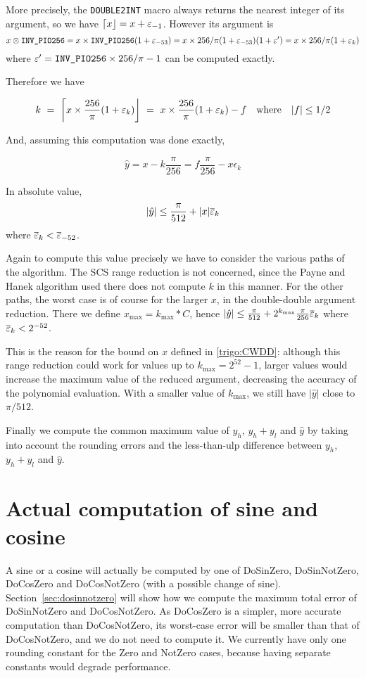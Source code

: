 More precisely, the \texttt{DOUBLE2INT} macro always returns the
nearest integer of its argument, so we have
$\left\lceil x \right\rfloor=x+\varepsilon_{-1}$. However its argument is
$$x\otimes\verb!INV_PIO256! = x \times
\verb!INV_PIO256!(1+\epsilon_{-53}) = x\times
256/\pi(1+\epsilon_{-53})(1+\epsilon')  = x\times
256/\pi(1+\epsilon_k)$$
where $\epsilon'=\verb!INV_PIO256!\times256/\pi-1$ can be
computed exactly.

Therefore we have 

$$k\ =\ \left\lceil x\times \frac{256}{\pi}(1+\varepsilon_k) \right\rfloor
\ =\ x\times \frac{256}{\pi}(1+\varepsilon_k) - f \quad\mbox{where} \quad |f|\le 1/2
$$

And, assuming this computation was done exactly,

$$\hat{y}=x-k\frac{\pi}{256} = f\frac{\pi}{256} - x\epsilon_k$$

In absolute value, $$\left|\hat{y}\right| \le \frac{\pi}{512} +
|x|{\overline{\varepsilon}}_k$$
where ${\overline{\varepsilon}}_k<{\overline{\varepsilon}}_{-52}$.

Again to compute this value precisely we have to consider the various
paths of the algorithm. The SCS range reduction is not concerned,
since the Payne and Hanek algorithm used there does not compute $k$ in
this manner. For the other paths, the worst case is of course for the
larger $x$, in the double-double argument reduction. There we define
$x_{\max} = k_{\max}*C$, hence  $\left|\hat{y}\right|
\le \frac{\pi}{512} + 2^{k_{\max}}\frac{\pi}{256}{\overline{\varepsilon}}_k$ where
${\overline{\varepsilon}}_k<2^{-52}$.


This is the reason for the bound on $x$ defined in \ref{trigo:CWDD}:
although this range reduction could work for values up to
$k_{\max}=2^{52}-1$, larger values would increase the maximum
value of the reduced argument, decreasing the accuracy of the
polynomial evaluation. With a smaller value of $k_{\max}$, we still have
$\left|\hat{y}\right|$ close to $\pi/512$. 

Finally we compute the common maximum value of $y_h$, $y_h+y_l$ and
$\widehat{y}$ by taking into account the rounding errors and the
less-than-ulp difference between $y_h$, $y_h+y_l$ and $\widehat{y}$.
 



\section{Actual computation of sine and cosine
  \label{trigo:auxiliary}}

A sine or a cosine will actually be computed by one of DoSinZero,
DoSinNotZero, DoCosZero and DoCosNotZero (with a possible change of sine).
Section~\ref{sec:dosinnotzero} will show how we compute the maximum
total error of DoSinNotZero and DoCosNotZero. As DoCosZero is a
simpler, more accurate computation than DoCosNotZero, its worst-case
error will be smaller than that of DoCosNotZero, and we do not need to
compute it. We currently have only one rounding constant for the Zero and
NotZero cases, because having separate constants would degrade performance.

